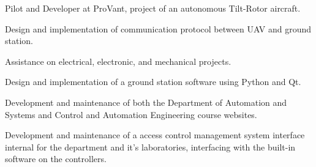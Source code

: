 \documentclass[A4]{deedy-resume} %
\begin{document}
\begin{minipage}[t]{0.66\textwidth}
\sectionspace %

\begin{tightitemize}
 \item Pilot and Developer at ProVant, project of an autonomous  Tilt-Rotor aircraft.
 \item Design and implementation of communication protocol between UAV and ground station.
 \item Assistance on electrical, electronic, and mechanical projects.
 \item Design and implementation of a ground station software using  Python and Qt.

\end{tightitemize}

\sectionspace %

\begin{tightitemize}
 \item Development and maintenance of both the Department of Automation and Systems and Control and Automation Engineering course websites.
\end{tightitemize}

\sectionspace %

\begin{tightitemize}
 \item Development and maintenance of a access control management system interface internal for the department and it's laboratories, interfacing with the built-in software on the controllers.
\end{tightitemize}

\sectionspace %







\end{minipage}
\end{document}
